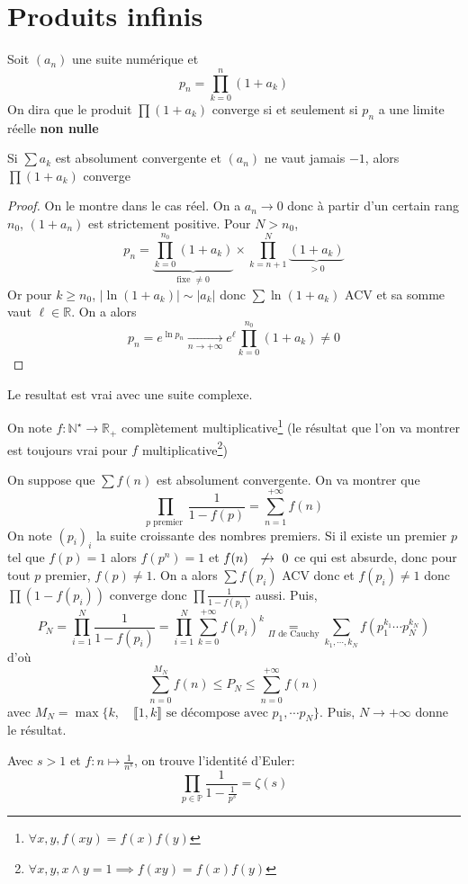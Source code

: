 \section{Produits infinis}

Soit $(a_n)$ une suite numérique et \[
    p_n=\prod_{k=0}^n(1+a_k)
\]
On dira que le produit $\prod(1+a_k)$ converge si et seulement si $p_n$ a une limite réelle \textbf{non nulle}

\begin{res}
    Si $\sum a_k$ est absolument convergente et $(a_n)$ ne vaut jamais $-1$, alors $\prod(1+a_k)$ converge
\end{res}

\begin{proof}
    On le montre dans le cas réel. On a $a_n\longrightarrow 0$ donc à partir d'un certain rang $n_0$, $(1+a_n)$ est strictement positive. Pour $N>n_0$, \[
        p_n=\underbrace{\prod_{k=0}^{n_0}(1+a_k)}_{\text{fixe } \neq 0}\times \prod_{k=n+1}^{N}\underbrace{(1+a_k)}_{>0}
    \]
    Or pour $k\geq n_0$, $|\ln(1+a_k)|\sim |a_k|$ donc $\sum \ln(1+a_k)$ ACV et sa somme vaut $\ell\in\mathbb R$. On a alors \[
        p_n=e^{\ln p_n}\xrightarrow[n\to+\infty]{}e^\ell \prod_{k=0}^{n_0}(1+a_k) \neq 0
    \]
\end{proof}

\begin{rem}
    Le resultat est vrai avec une suite complexe.
\end{rem}

\begin{ex}
    On note $f:\mathbb N^\star\longrightarrow \mathbb R_+$ complètement multiplicative\footnote{$\forall x,y, f(xy)=f(x)f(y)$} (le résultat que l'on va montrer est toujours vrai pour $f$ multiplicative\footnote{$\forall x,y, x\land y=1\implies f(xy)=f(x)f(y)$})

    On suppose que $\sum f(n)$ est absolument convergente. On va montrer que \[
        \prod_{p\text{ premier }} \frac1{1-f(p)}=\sum_{n=1}^{+\infty}f(n)
    \]
    On note $(p_i)_i$ la suite croissante des nombres premiers. Si il existe un premier $p$ tel que $f(p)=1$ alors $f(p^n)=1$ et $f(n)\xnrightarrow{}0$ ce qui est absurde, donc pour tout $p$ premier, $f(p)\neq 1$.
    On a alors $\sum f(p_i)$ ACV donc et $f(p_i)\neq 1$ donc $\prod (1-f(p_i))$ converge donc $\prod \frac1{1-f(p_i)}$ aussi. Puis, \[
        P_N=\prod_{i=1}^N\frac1{1-f(p_i)}=\prod_{i=1}^N \sum_{k=0}^{+\infty}f(p_i)^k\underset{\Pi\text{ de Cauchy}}=\sum_{k_1, \cdots, k_N}f(p_1^{k_1}\cdots p_N^{k_N})
    \]
    d'où \[
        \sum_{n=0}^{M_N}f(n)\leq P_N\leq\sum_{n=0}^{+\infty}f(n)
    \]
    avec $M_N=\max \{k, \quad \llbracket 1, k\rrbracket\text{ se décompose avec } p_1, \cdots p_N\}$. Puis, $N\to+\infty$ donne le résultat.
\end{ex}

Avec $s>1$ et $f:n\longmapsto \frac1{n^s}$, on trouve l'identité d'Euler: \[
    \prod_{p\in\mathbb P}\frac1{1-\frac1{p^s}}=\zeta(s)
\]

\endchapter
